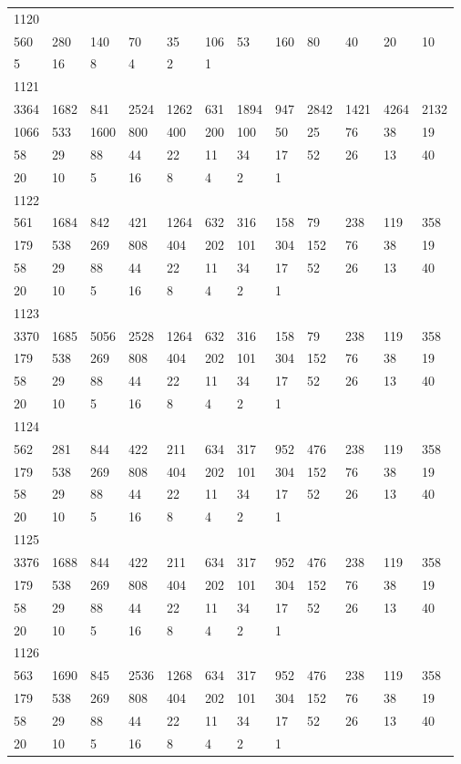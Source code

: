\begin{longtable}{llllllllllll}
1120&&&&&&&&&&&\\
560& 280& 140& 70& 35& 106& 53& 160& 80& 40& 20& 10\\
5& 16& 8& 4& 2& 1& \\

1121&&&&&&&&&&&\\
3364& 1682& 841& 2524& 1262& 631& 1894& 947& 2842& 1421& 4264& 2132\\
1066& 533& 1600& 800& 400& 200& 100& 50& 25& 76& 38& 19\\
58& 29& 88& 44& 22& 11& 34& 17& 52& 26& 13& 40\\
20& 10& 5& 16& 8& 4& 2& 1& \\

1122&&&&&&&&&&&\\
561& 1684& 842& 421& 1264& 632& 316& 158& 79& 238& 119& 358\\
179& 538& 269& 808& 404& 202& 101& 304& 152& 76& 38& 19\\
58& 29& 88& 44& 22& 11& 34& 17& 52& 26& 13& 40\\
20& 10& 5& 16& 8& 4& 2& 1& \\

1123&&&&&&&&&&&\\
3370& 1685& 5056& 2528& 1264& 632& 316& 158& 79& 238& 119& 358\\
179& 538& 269& 808& 404& 202& 101& 304& 152& 76& 38& 19\\
58& 29& 88& 44& 22& 11& 34& 17& 52& 26& 13& 40\\
20& 10& 5& 16& 8& 4& 2& 1& \\

1124&&&&&&&&&&&\\
562& 281& 844& 422& 211& 634& 317& 952& 476& 238& 119& 358\\
179& 538& 269& 808& 404& 202& 101& 304& 152& 76& 38& 19\\
58& 29& 88& 44& 22& 11& 34& 17& 52& 26& 13& 40\\
20& 10& 5& 16& 8& 4& 2& 1& \\

1125&&&&&&&&&&&\\
3376& 1688& 844& 422& 211& 634& 317& 952& 476& 238& 119& 358\\
179& 538& 269& 808& 404& 202& 101& 304& 152& 76& 38& 19\\
58& 29& 88& 44& 22& 11& 34& 17& 52& 26& 13& 40\\
20& 10& 5& 16& 8& 4& 2& 1& \\

1126&&&&&&&&&&&\\
563& 1690& 845& 2536& 1268& 634& 317& 952& 476& 238& 119& 358\\
179& 538& 269& 808& 404& 202& 101& 304& 152& 76& 38& 19\\
58& 29& 88& 44& 22& 11& 34& 17& 52& 26& 13& 40\\
20& 10& 5& 16& 8& 4& 2& 1& \\


\end{longtable}
